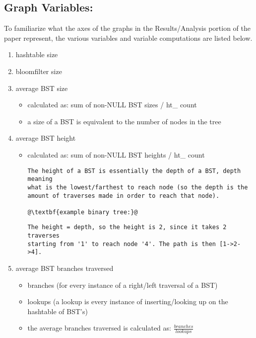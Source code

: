 \documentclass[
	12pt, %
]{fphw}
\begin{document}
\subsection{Graph Variables:}
To familiarize what the axes of the graphs in the Results/Analysis portion of the paper represent, the various variables and variable computations are listed below.

\begin{enumerate}
	\item hashtable size
	
	\item bloomfilter size
	
	\item average BST size 
	\begin{itemize}
		\item calculated as: sum of non-NULL BST sizes / ht\_ count
		\item a size of a BST is equivalent to the number of nodes in the tree	
	\end{itemize}
	
	\item average BST height
	\begin{itemize}
		\item calculated as: sum of non-NULL BST heights / ht\_ count
\begin{lstlisting}[escapechar=@]
The height of a BST is essentially the depth of a BST, depth meaning
what is the lowest/farthest to reach node (so the depth is the 
amount of traverses made in order to reach that node).
	
@\textbf{example binary tree:}@
\end{lstlisting}
\begin{lstlisting}
The height = depth, so the height is 2, since it takes 2 traverses
starting from '1' to reach node '4'. The path is then [1->2->4].
\end{lstlisting}
	\end{itemize}

	\item average BST branches traversed
	\begin{itemize}
		\item branches (for every instance of a right/left traversal of a BST)
		\item lookups (a lookup is every instance of inserting/looking up on the hashtable of BST's)
		\item the average branches traversed is calculated as: $\frac{branches}{lookups}$
	\end{itemize}
	

\end{enumerate}
\end{document}

